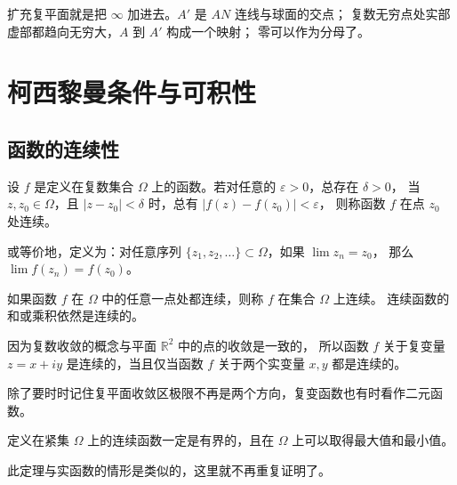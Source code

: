 \documentclass[lang=cn,10pt]{elegantbook}
\begin{document}
\begin{dxtips}
    


扩充复平面就是把 $\infty$ 加进去。$A'$ 是 $AN$ 连线与球面的交点；
复数无穷点处实部虚部都趋向无穷大，$A$ 到 $A'$ 构成一个映射；
零可以作为分母了。

\end{dxtips}







\chapter{柯西黎曼条件与可积性}
\section{函数的连续性}
\begin{definition}[复变函数连续性]
    

设 $f$ 是定义在复数集合 $\Omega$ 上的函数。若对任意的 $\varepsilon > 0$，总存在 $\delta > 0$，
当 $z, z_0 \in \Omega$，且 $|z - z_0| < \delta$ 时，总有 $|f(z)-f(z_0)| < \varepsilon$，
则称函数 $f$ 在点 $z_0$ 处连续。

或等价地，定义为：对任意序列 $\{z_1, z_2, \dots\} \subset \Omega$，如果 $\lim z_n = z_0$，
那么 $\lim f(z_n) = f(z_0)$。

如果函数 $f$ 在 $\Omega$ 中的任意一点处都连续，则称 $f$ 在集合 $\Omega$ 上连续。
连续函数的和或乘积依然是连续的。

因为复数收敛的概念与平面 $\mathbb{R}^2$ 中的点的收敛是一致的，
所以函数 $f$ 关于复变量 $z = x + i y$ 是连续的，当且仅当函数 $f$ 关于两个实变量 $x,y$ 都是连续的。
\end{definition}
\begin{dxtips}
    除了要时时记住复平面收敛区极限不再是两个方向，复变函数也有时看作二元函数。
\end{dxtips}

\begin{theorem}[2.1]
定义在紧集 $\Omega$ 上的连续函数一定是有界的，且在 $\Omega$ 上可以取得最大值和最小值。  

此定理与实函数的情形是类似的，这里就不再重复证明了。
\end{theorem}
\end{document}
